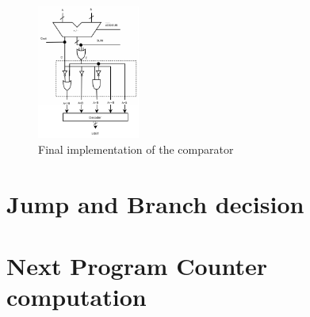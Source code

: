 \begin{figure}[H]
	\centering
	\includegraphics[width=0.3\textwidth]{chapters/4_DecodeStage/images/cmp_final.pdf}
	\caption{Final implementation of the comparator}
	\label{cmp_final}
\end{figure}

\section{Jump and Branch decision}
\section{Next Program Counter computation}